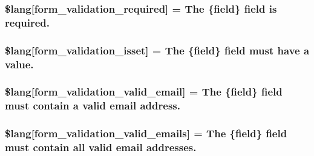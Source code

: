 \subsubsection[{\$lang}]{\setlength{\rightskip}{0pt plus 5cm}\$lang\mbox{[}\textquotesingle{}form\+\_\+validation\+\_\+required\textquotesingle{}\mbox{]} = \textquotesingle{}The \{field\} field is required.\textquotesingle{}}\label{form__validation__lang_8php_a2335c24e2213207c5dda58ec093673a9}
\hypertarget{form__validation__lang_8php_a941575e651258a5a17341aca4e587898}{}
\subsubsection[{\$lang}]{\setlength{\rightskip}{0pt plus 5cm}\$lang\mbox{[}\textquotesingle{}form\+\_\+validation\+\_\+isset\textquotesingle{}\mbox{]} = \textquotesingle{}The \{field\} field must have {\bf a} value.\textquotesingle{}}\label{form__validation__lang_8php_a941575e651258a5a17341aca4e587898}
\hypertarget{form__validation__lang_8php_a652d5be4d397dcac4407294c2436af34}{}
\subsubsection[{\$lang}]{\setlength{\rightskip}{0pt plus 5cm}\$lang\mbox{[}\textquotesingle{}form\+\_\+validation\+\_\+valid\+\_\+email\textquotesingle{}\mbox{]} = \textquotesingle{}The \{field\} field must contain {\bf a} valid email address.\textquotesingle{}}\label{form__validation__lang_8php_a652d5be4d397dcac4407294c2436af34}
\hypertarget{form__validation__lang_8php_af9ec234a36f18a91c981985c3db4333e}{}
\subsubsection[{\$lang}]{\setlength{\rightskip}{0pt plus 5cm}\$lang\mbox{[}\textquotesingle{}form\+\_\+validation\+\_\+valid\+\_\+emails\textquotesingle{}\mbox{]} = \textquotesingle{}The \{field\} field must contain {\bf all} valid email addresses.\textquotesingle{}}\label{form__validation__lang_8php_af9ec234a36f18a91c981985c3db4333e}
\hypertarget{form__validation__lang_8php_af9467e9ed3767f5bff205b79d706fe0a}{}
